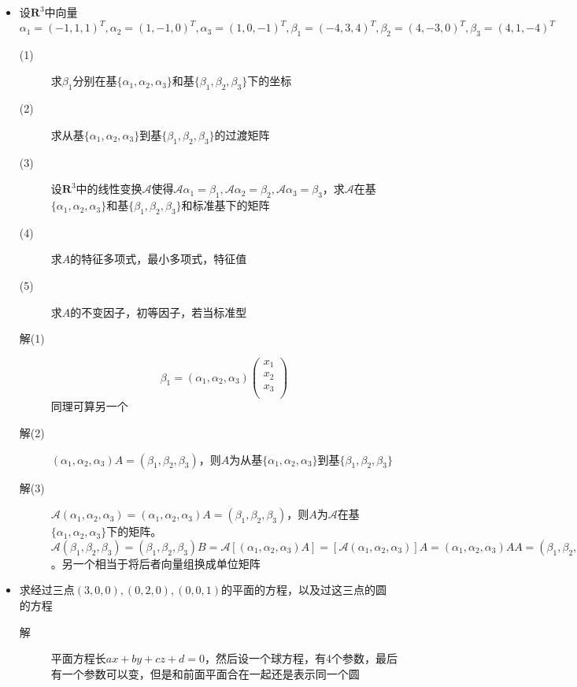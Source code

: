 \begin{itemize}
\item 设$\mathbf{R}^3$中向量$\alpha_1=(-1,1,1)^T,\alpha_2=(1,-1,0)^T,\alpha_3=(1,0,-1)^T,\beta_1=(-4,3,4)^T,\beta_2=(4,-3,0)^T,\beta_3=(4,1,-4)^T$
\begin{description}
\item[(1)] 求$\beta_1$分别在基$\{\alpha_1,\alpha_2,\alpha_3\}$和基$\{\beta_1,\beta_2,\beta_3\}$下的坐标
\item[(2)] 求从基$\{\alpha_1,\alpha_2,\alpha_3\}$到基$\{\beta_1,\beta_2,\beta_3\}$的过渡矩阵
\item[(3)] 设$\mathbf{R}^3$中的线性变换$\mathcal{A}$使得$\mathcal{A}\alpha_1=\beta_1,\mathcal{A}\alpha_2=\beta_2,\mathcal{A}\alpha_3=\beta_3$，求$\mathcal{A}$在基$\{\alpha_1,\alpha_2,\alpha_3\}$和基$\{\beta_1,\beta_2,\beta_3\}$和标准基下的矩阵
\item[(4)] 求$A$的特征多项式，最小多项式，特征值
\item[(5)] 求$A$的不变因子，初等因子，若当标准型
\item[解(1)]
\[
\beta_1 = (\alpha_1,\alpha_2,\alpha_3)\left(
\begin{array}{c}
x_1\\
x_2\\
x_3\\
\end{array}
\right)
\]
同理可算另一个
\item[解(2)] $(\alpha_1,\alpha_2,\alpha_3)A=(\beta_1,\beta_2,\beta_3)$，则$A$为从基$\{\alpha_1,\alpha_2,\alpha_3\}$到基$\{\beta_1,\beta_2,\beta_3\}$
\item[解(3)] $\mathcal{A}(\alpha_1,\alpha_2,\alpha_3)=(\alpha_1,\alpha_2,\alpha_3)A=(\beta_1,\beta_2,\beta_3)$，则$A$为$\mathcal{A}$在基$\{\alpha_1,\alpha_2,\alpha_3\}$下的矩阵。$\mathcal{A}(\beta_1,\beta_2,\beta_3)=(\beta_1,\beta_2,\beta_3)B=\mathcal{A}[(\alpha_1,\alpha_2,\alpha_3)A]=[\mathcal{A}(\alpha_1,\alpha_2,\alpha_3)]A=(\alpha_1,\alpha_2,\alpha_3)AA=(\beta_1,\beta_2,\beta_3)A^{-1}AA$。另一个相当于将后者向量组换成单位矩阵
\end{description}

\item 求经过三点$(3,0,0),(0,2,0),(0,0,1)$的平面的方程，以及过这三点的圆的方程
\begin{description}
\item[解] 平面方程长$ax+by+cz+d=0$，然后设一个球方程，有4个参数，最后有一个参数可以变，但是和前面平面合在一起还是表示同一个圆
\end{description}


\end{itemize}
